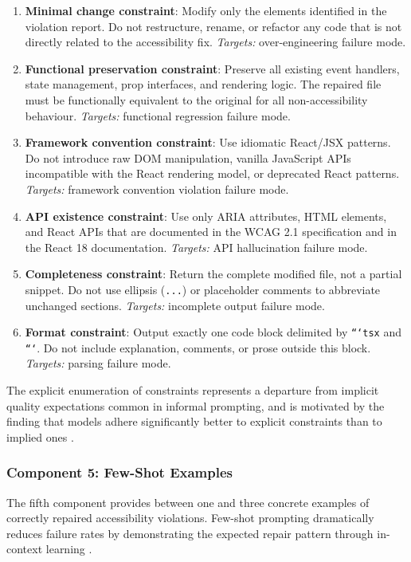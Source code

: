 \begin{enumerate}
  \item \textbf{Minimal change constraint}: Modify only the elements
    identified in the violation report.  Do not restructure, rename, or
    refactor any code that is not directly related to the accessibility fix.
    \emph{Targets:} over-engineering failure mode.
  \item \textbf{Functional preservation constraint}: Preserve all existing
    event handlers, state management, prop interfaces, and rendering logic.
    The repaired file must be functionally equivalent to the original for
    all non-accessibility behaviour.
    \emph{Targets:} functional regression failure mode.
  \item \textbf{Framework convention constraint}: Use idiomatic React/JSX
    patterns.  Do not introduce raw DOM manipulation, vanilla JavaScript
    APIs incompatible with the React rendering model, or deprecated React
    patterns.
    \emph{Targets:} framework convention violation failure mode.
  \item \textbf{API existence constraint}: Use only ARIA attributes, HTML
    elements, and React APIs that are documented in the WCAG 2.1
    specification and in the React 18 documentation.
    \emph{Targets:} API hallucination failure mode.
  \item \textbf{Completeness constraint}: Return the complete modified file,
    not a partial snippet.  Do not use ellipsis (\texttt{...}) or placeholder
    comments to abbreviate unchanged sections.
    \emph{Targets:} incomplete output failure mode.
  \item \textbf{Format constraint}: Output exactly one code block delimited
    by \texttt{```tsx} and \texttt{```}.  Do not include explanation,
    comments, or prose outside this block.
    \emph{Targets:} parsing failure mode.
\end{enumerate}

\noindent
The explicit enumeration of constraints represents a departure from implicit
quality expectations common in informal prompting, and is motivated by
the finding that models adhere significantly better to explicit constraints
than to implied ones \cite{white2023prompt}.

\subsubsection{Component 5: Few-Shot Examples}

The fifth component provides between one and three concrete examples of
correctly repaired accessibility violations.  Few-shot prompting dramatically
reduces failure rates by demonstrating the expected repair pattern through
in-context learning \cite{brown2020,min2022rethinking}.

